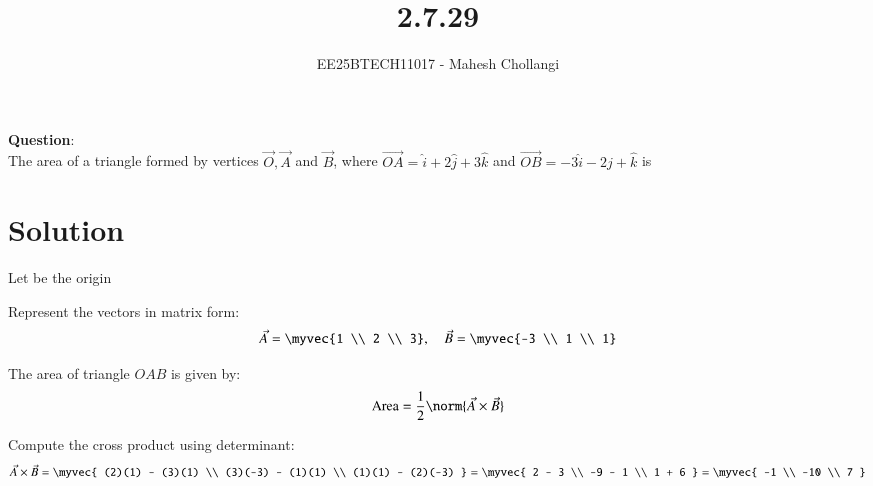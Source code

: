 \documentclass[journal]{IEEEtran}
\begin{document}

\vspace{3cm}

\title{2.7.29}
\author{EE25BTECH11017 - Mahesh Chollangi}
\maketitle
{\let\newpage\relax\maketitle}

\renewcommand{\thefigure}{\theenumi}
\renewcommand{\thetable}{\theenumi}
\setlength{\intextsep}{10pt} %


\renewcommand{\thetable}{\theenumi}

\textbf{Question}:\\
The area of a triangle formed by vertices $\vec{O}, \vec{A}$ and $\vec{B}$, where $\vec{OA} = \hat{i} + 2\hat{j} + 3\hat{k}$ and $\vec{OB} = -3\hat{i} - 2\hat{j} + \hat{k}$ is


\section*{Solution}

Let  be the origin

Represent the vectors in matrix form:
\begin{align}
\vec{A} = \myvec{1 \\ 2 \\ 3}, \quad
\vec{B} = \myvec{-3 \\ 1 \\ 1}
\end{align}

The area of triangle $OAB$ is given by:
\begin{align}
\text{Area} = \frac{1}{2} \norm{\vec{A} \times \vec{B}}
\end{align}

Compute the cross product using determinant:
\begin{align}
\vec{A} \times \vec{B} =
\myvec{
(2)(1) - (3)(1) \\
(3)(-3) - (1)(1) \\
(1)(1) - (2)(-3)
}
=
\myvec{
2 - 3 \\
-9 - 1 \\
1 + 6
}
=
\myvec{
-1 \\
-10 \\
7
}
\end{align}
\end{document}
